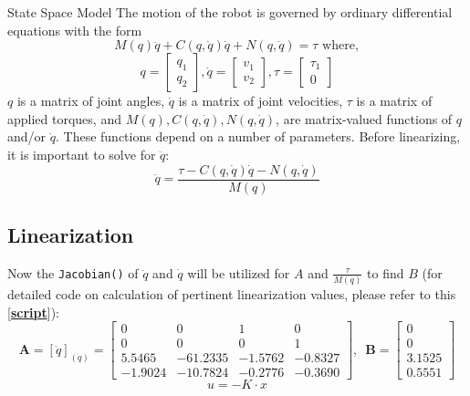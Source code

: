 \documentclass[12pt]{article}
\begin{document}
\newpage

\begin{section}{State Space Model}
The motion of the robot is governed by ordinary differential equations with the form
\begin{equation}
\label{eqEOM}
M(q) \ddot{q} + C(q,\dot{q})\dot{q} + N(q,\dot{q}) = \tau \mbox{ where},
\end{equation}
\begin{equation*}
q = \begin{bmatrix} q_{1} \\ q_{2} \end{bmatrix}, 
\dot{q} = \begin{bmatrix} v_{1} \\ v_{2} \end{bmatrix},
\tau = \begin{bmatrix} \tau_{1} \\ 0 \end{bmatrix}
\end{equation*}
$q$ is a matrix of joint angles, $\dot{q}$ is a matrix of joint velocities, $\tau$ is a matrix of applied torques, and $M(q), C(q,\dot{q}), N(q,\dot{q})$, are matrix-valued functions of $q$ and/or $\dot{q}$. These functions depend on a number of parameters.  Before linearizing, it is important to solve for $\ddot{q}$:
\begin{equation}
    \ddot{q} = \frac{\tau - C(q,\dot{q})\dot{q} - N(q, \dot{q})}{M(q)}
\end{equation}
\subsection{Linearization}
Now the \lstinline{Jacobian()} of $\ddot{q}$ and $\dot{q}$ will be utilized for $A$ and $\frac{\tau}{M(q)}$ to find $B$ (for detailed code on calculation of pertinent linearization values, please refer to this [\href{https://drive.google.com/file/d/1SKI_ZmOP5XFAXiwL9oEj5oYMP6tqxz1v/view?usp=sharing}{\textbf{script}}]):
\[
     \textbf{A} = [\ddot{q}]_{(\dot{q})} = 
     \begin{bmatrix}
         0 & 0 & 1 & 0 \\
         0 & 0 & 0 & 1 \\
         5.5465 & -61.2335 & -1.5762 & -0.8327 \\
         -1.9024 & -10.7824 & -0.2776 & -0.3690
     \end{bmatrix}, \enspace
     \textbf{B} =
     \begin{bmatrix}
         0 \\ 0 \\ 3.1525 \\ 0.5551
     \end{bmatrix}
\]
\[
    u = -K\cdot x
\]


\end{section}
\end{document}
